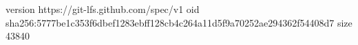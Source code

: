 version https://git-lfs.github.com/spec/v1
oid sha256:5777be1c353f6dbef1283ebff128cb4c264a11d5f9a70252ae294362f54408d7
size 43840
